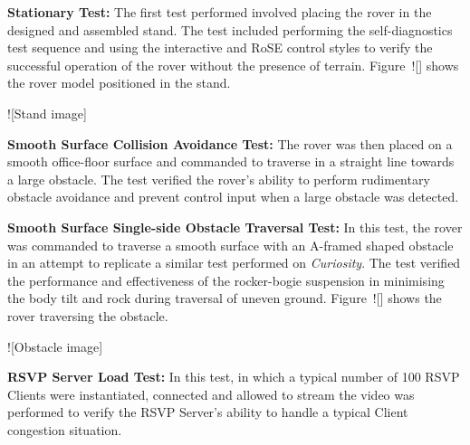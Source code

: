     \begin{TEST}
      \item\label{test:stationaryTest} \textbf{Stationary Test:} The first test performed involved placing the rover in the designed and assembled stand. The test included performing the self-diagnostics test sequence and using the interactive and RoSE control styles to verify the successful operation of the rover without the presence of terrain. Figure~![] shows the rover model positioned in the stand.
      
      ![Stand image]
      
      \item\label{test:collisionTest} \textbf{Smooth Surface Collision Avoidance Test:} The rover was then placed on a smooth office-floor surface and commanded to traverse in a straight line towards a large obstacle. The test verified the rover's ability to perform rudimentary obstacle avoidance and prevent control input when a large obstacle was detected.
      
      \item\label{test:obstacleTest} \textbf{Smooth Surface Single-side Obstacle Traversal Test:} In this test, the rover was commanded to traverse a smooth surface with an A-framed shaped obstacle in an attempt to replicate a similar test performed on \textit{Curiosity}. The test verified the performance and effectiveness of the rocker-bogie suspension in minimising the body tilt and rock during traversal of uneven ground. Figure~![] shows the rover traversing the obstacle.
      
      ![Obstacle image]
      
      \item\label{test:serverLoadTest} \textbf{RSVP Server Load Test:} In this test, in which a typical number of 100 RSVP Clients were instantiated, connected and allowed to stream the video was performed to verify the RSVP Server's ability to handle a typical Client congestion situation.
    
    \end{TEST}